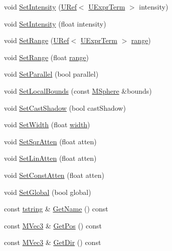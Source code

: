 \begin{CompactItemize}
\item 
void \hyperlink{class_gr_light_0ff00ad818e97416b1d63f6dba36a444}{SetIntensity} (\hyperlink{class_u_ref}{URef}$<$ \hyperlink{class_u_expr_term}{UExprTerm} $>$ intensity)
\item 
void \hyperlink{class_gr_light_2bc38d15e8a634268056817102ed4df0}{SetIntensity} (float intensity)
\item 
void \hyperlink{class_gr_light_509f7eed244a60f3b27281049b7410e2}{SetRange} (\hyperlink{class_u_ref}{URef}$<$ \hyperlink{class_u_expr_term}{UExprTerm} $>$ \hyperlink{glext__bak_8h_7b8ad0b27a927682837f95528fa454f5}{range})
\item 
void \hyperlink{class_gr_light_c3e94f351a1f1b794012085bf064567f}{SetRange} (float \hyperlink{glext__bak_8h_7b8ad0b27a927682837f95528fa454f5}{range})
\item 
void \hyperlink{class_gr_light_a6bd83e0258a25bea793cdc6aa65d175}{SetParallel} (bool parallel)
\item 
void \hyperlink{class_gr_light_b3588c8d402aa2486233dbc258592909}{SetLocalBounds} (const \hyperlink{class_m_sphere}{MSphere} \&bounds)
\item 
void \hyperlink{class_gr_light_7c2845100b12ebc9c1c37ccc403ea1d8}{SetCastShadow} (bool castShadow)
\item 
void \hyperlink{class_gr_light_e9d277fb571428a9afdcc84e773718e0}{SetWidth} (float \hyperlink{wglext_8h_e6531b1788ca42a9ae8155b0c52e7630}{width})
\item 
void \hyperlink{class_gr_light_85197478e33da961098f11a9f63e31e1}{SetSqrAtten} (float atten)
\item 
void \hyperlink{class_gr_light_cbe776981b08fa29e2a7f864be4c95ee}{SetLinAtten} (float atten)
\item 
void \hyperlink{class_gr_light_98f2b78251ec1358a262846b838c3d42}{SetConstAtten} (float atten)
\item 
void \hyperlink{class_gr_light_b057e347b0e89b3d0e378c8cfd4ea8fb}{SetGlobal} (bool global)
\item 
const \hyperlink{common__afx_8h_816fa58fd77499b0edb2c69ebe803d5c}{tstring} \& \hyperlink{class_gr_light_e1ffc9555baeb3ff122b8faeafc152b0}{GetName} () const 
\item 
const \hyperlink{class_m_vec3}{MVec3} \& \hyperlink{class_gr_light_0d4a1686505a6cacd389144659887e73}{GetPos} () const 
\item 
const \hyperlink{class_m_vec3}{MVec3} \& \hyperlink{class_gr_light_1b6604c1d7bf5d5aab3d99969b114f67}{GetDir} () const 
\item 

\end{CompactItemize}

